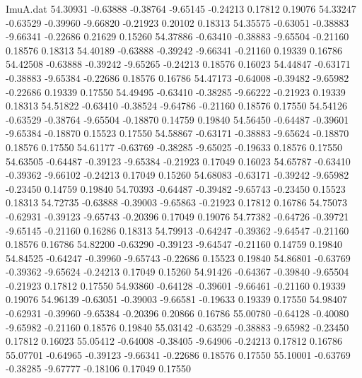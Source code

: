 \begin{filecontents}{ImuA.dat}
  54.30931   -0.63888   -0.38764   -9.65145   -0.24213    0.17812    0.19076
  54.33247   -0.63529   -0.39960   -9.66820   -0.21923    0.20102    0.18313
  54.35575   -0.63051   -0.38883   -9.66341   -0.22686    0.21629    0.15260
  54.37886   -0.63410   -0.38883   -9.65504   -0.21160    0.18576    0.18313
  54.40189   -0.63888   -0.39242   -9.66341   -0.21160    0.19339    0.16786
  54.42508   -0.63888   -0.39242   -9.65265   -0.24213    0.18576    0.16023
  54.44847   -0.63171   -0.38883   -9.65384   -0.22686    0.18576    0.16786
  54.47173   -0.64008   -0.39482   -9.65982   -0.22686    0.19339    0.17550
  54.49495   -0.63410   -0.38285   -9.66222   -0.21923    0.19339    0.18313
  54.51822   -0.63410   -0.38524   -9.64786   -0.21160    0.18576    0.17550
  54.54126   -0.63529   -0.38764   -9.65504   -0.18870    0.14759    0.19840
  54.56450   -0.64487   -0.39601   -9.65384   -0.18870    0.15523    0.17550
  54.58867   -0.63171   -0.38883   -9.65624   -0.18870    0.18576    0.17550
  54.61177   -0.63769   -0.38285   -9.65025   -0.19633    0.18576    0.17550
  54.63505   -0.64487   -0.39123   -9.65384   -0.21923    0.17049    0.16023
  54.65787   -0.63410   -0.39362   -9.66102   -0.24213    0.17049    0.15260
  54.68083   -0.63171   -0.39242   -9.65982   -0.23450    0.14759    0.19840
  54.70393   -0.64487   -0.39482   -9.65743   -0.23450    0.15523    0.18313
  54.72735   -0.63888   -0.39003   -9.65863   -0.21923    0.17812    0.16786
  54.75073   -0.62931   -0.39123   -9.65743   -0.20396    0.17049    0.19076
  54.77382   -0.64726   -0.39721   -9.65145   -0.21160    0.16286    0.18313
  54.79913   -0.64247   -0.39362   -9.64547   -0.21160    0.18576    0.16786
  54.82200   -0.63290   -0.39123   -9.64547   -0.21160    0.14759    0.19840
  54.84525   -0.64247   -0.39960   -9.65743   -0.22686    0.15523    0.19840
  54.86801   -0.63769   -0.39362   -9.65624   -0.24213    0.17049    0.15260
  54.91426   -0.64367   -0.39840   -9.65504   -0.21923    0.17812    0.17550
  54.93860   -0.64128   -0.39601   -9.66461   -0.21160    0.19339    0.19076
  54.96139   -0.63051   -0.39003   -9.66581   -0.19633    0.19339    0.17550
  54.98407   -0.62931   -0.39960   -9.65384   -0.20396    0.20866    0.16786
  55.00780   -0.64128   -0.40080   -9.65982   -0.21160    0.18576    0.19840
  55.03142   -0.63529   -0.38883   -9.65982   -0.23450    0.17812    0.16023
  55.05412   -0.64008   -0.38405   -9.64906   -0.24213    0.17812    0.16786
  55.07701   -0.64965   -0.39123   -9.66341   -0.22686    0.18576    0.17550
  55.10001   -0.63769   -0.38285   -9.67777   -0.18106    0.17049    0.17550

\end{filecontents}
